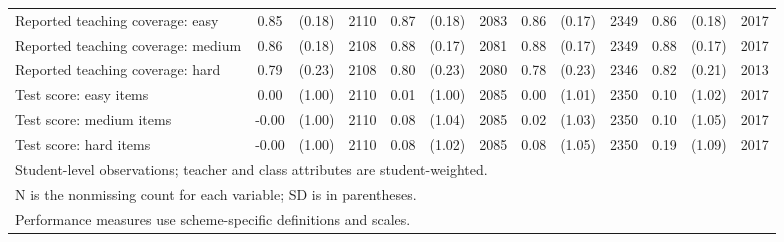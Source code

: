 \begin{table}[htbp]
\begin{tabular}{l*{4}{ccc}}
Reported teaching coverage: easy&        0.85&      (0.18)&        2110&        0.87&      (0.18)&        2083&        0.86&      (0.17)&        2349&        0.86&      (0.18)&        2017\\
Reported teaching coverage: medium&        0.86&      (0.18)&        2108&        0.88&      (0.17)&        2081&        0.88&      (0.17)&        2349&        0.88&      (0.17)&        2017\\
Reported teaching coverage: hard&        0.79&      (0.23)&        2108&        0.80&      (0.23)&        2080&        0.78&      (0.23)&        2346&        0.82&      (0.21)&        2013\\
Test score: easy items&        0.00&      (1.00)&        2110&        0.01&      (1.00)&        2085&        0.00&      (1.01)&        2350&        0.10&      (1.02)&        2017\\
Test score: medium items&       -0.00&      (1.00)&        2110&        0.08&      (1.04)&        2085&        0.02&      (1.03)&        2350&        0.10&      (1.05)&        2017\\
Test score: hard items&       -0.00&      (1.00)&        2110&        0.08&      (1.02)&        2085&        0.08&      (1.05)&        2350&        0.19&      (1.09)&        2017\\
\hline\hline
\multicolumn{13}{l}{\footnotesize Student-level observations; teacher and class attributes are student-weighted.}\\
\multicolumn{13}{l}{\footnotesize N is the nonmissing count for each variable; SD is in parentheses.}\\
\multicolumn{13}{l}{\footnotesize Performance measures use scheme-specific definitions and scales.}\\
\end{tabular}
\end{table}

